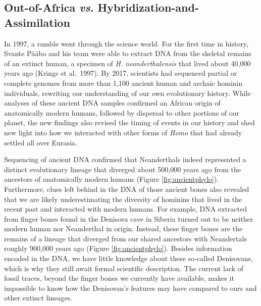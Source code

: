\documentclass[
]{book}
\begin{document}
\hypertarget{out-of-africa-vs.-hybridization-and-assimilation}{%
\subsection{\texorpdfstring{Out-of-Africa \emph{vs}. Hybridization-and-Assimilation}{Out-of-Africa vs. Hybridization-and-Assimilation}}\label{out-of-africa-vs.-hybridization-and-assimilation}}

In 1997, a rumble went through the science world. For the first time in history, Svante Pääbo and his team were able to extract DNA from the skeletal remains of an extinct human, a specimen of \emph{H. neanderthalensis} that lived about 40,000 years ago (Krings et al.~1997). By 2017, scientists had sequenced partial or complete genomes from more than 1,100 ancient human and archaic hominin individuals, rewriting our understanding of our own evolutionary history. While analyses of these ancient DNA samples confirmed an African origin of anatomically modern humans, followed by dispersal to other portions of our planet, the new findings also revised the timing of events in our history and shed new light into how we interacted with other forms of \emph{Homo} that had already settled all over Eurasia.

Sequencing of ancient DNA confirmed that Neanderthals indeed represented a distinct evolutionary lineage that diverged about 500,000 years ago from the ancestors of anatomically modern humans (Figure \ref{fig:ancientphylo}). Furthermore, clues left behind in the DNA of those ancient bones also revealed that we are likely underestimating the diversity of hominins that lived in the recent past and interacted with modern humans. For example, DNA extracted from finger bones found in the Denisova cave in Siberia turned out to be neither modern human nor Neanderthal in origin. Instead, these finger bones are the remains of a lineage that diverged from our shared ancestors with Neandertals roughly 900,000 years ago (Figure \ref{fig:ancientphylo}). Besides information encoded in the DNA, we have little knowledge about these so-called Denisovans, which is why they still await formal scientific description. The current lack of fossil traces, beyond the finger bones we currently have available, makes it impossible to know how the Denisovan's features may have compared to ours and other extinct lineages.
\end{document}
